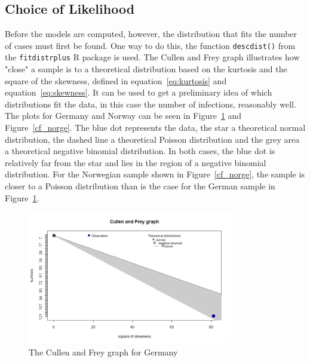 \subsection{Choice of Likelihood}
Before the models are computed, however, the distribution that fits the number of cases must first be found. One way to do this, the function \texttt{descdist()} from the \texttt{fitdistrplus} R package is used. The Cullen and Frey graph illustrates how "close" a sample is to a theoretical distribution based on the kurtosis and the square of the skewness, defined in equation~\ref{eq:kurtosis} and equation~\ref{eq:skewness}. It can be used to get a preliminary idea of which distributions fit the data, in this case the number of infections, reasonably well. \\
The plots for Germany and Norway can be seen in Figure~\ref{cf_germany} and Figure~\ref{cf_norge}. The blue dot represents the data, the star a theoretical normal distribution, the dashed line a theoretical Poisson distribution and the grey area a theoretical negative binomial distribution. In both cases, the blue dot is relatively far from the star and lies in the region of a negative binomial distribution. For the Norwegian sample shown in Figure~\ref{cf_norge}, the sample is closer to a Poisson distribution than is the case for the German sample in Figure~\ref{cf_germany}.
%     
\begin{figure}[H]
    \centering
    \includegraphics[width = 0.8\textwidth]{cf_germany.png}
    \caption{The Cullen and Frey graph for Germany}
    \label{cf_germany}
\end{figure}
